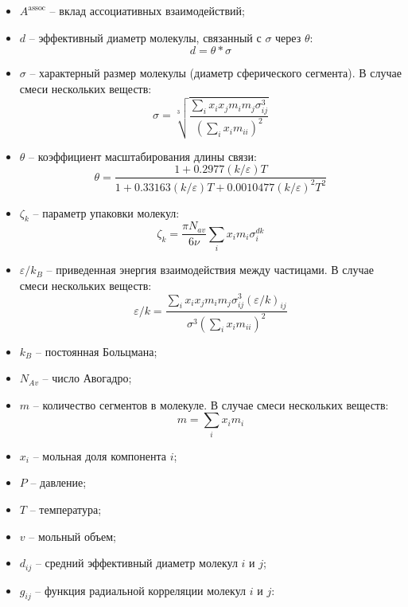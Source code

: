 \documentclass[a4paper,12pt]{article}
\begin{document}
\begin{itemize}
        \item \( A^{\text{assoc}} \) -- вклад ассоциативных взаимодействий;
        \item $d$ -- эффективный диаметр молекулы, связанный с $\sigma$ через $\theta$:
          \[
            d = \theta * \sigma
          \]
        \item $\sigma$ -- характерный размер молекулы (диаметр сферического сегмента). В случае смеси нескольких веществ:
          \begin{equation}
            \sigma = \sqrt[3]{\frac{\sum_i x_i x_j m_i m_j \sigma_{ij}^3}{(\sum_i x_i m_{ii})^2}}
          \end{equation}
        \item $\theta$ -- коэффициент масштабирования длины связи:
          \[
          \theta = \frac{1 + 0.2977 (k / \varepsilon) T}{1 + 0.33163 (k / \varepsilon) T + 0.0010477 (k / \varepsilon)^2 T^2}
          \]
        \item $\zeta_k$ -- параметр упаковки молекул:
          \[
          \zeta_k = \frac{\pi N_{av}}{6 \nu} \sum_i x_i m_i \sigma_i^{dk}
          \]
        \item $\varepsilon / k_B$ -- приведенная энергия взаимодействия между частицами. В случае смеси нескольких веществ:
          \begin{equation}
            \varepsilon / k = \frac{\sum_i x_i x_j m_i m_j \sigma_{ij}^3 (\varepsilon / k)_{ij}}{\sigma^3 (\sum_i x_i m_{ii})^2}
          \end{equation}
        \item $k_B$ -- постоянная Больцмана;
        \item $N_{Av}$ -- число Авогадро;
        \item $m$ -- количество сегментов в молекуле. В случае смеси нескольких веществ:
          \begin{equation}
            m = \sum_i x_i m_i
          \end{equation}
        \item $x_i$ -- мольная доля компонента $i$;
        \item $P$ -- давление;
        \item $T$ -- температура;
        \item $v$ -- мольный объем;
        \item $d_{ij}$ -- средний эффективный диаметр молекул $i$ и $j$;
        \item $g_{ij}$ -- функция радиальной корреляции молекул $i$ и $j$:
          \begin{equation}

\end{equation}
\end{itemize}
\end{document}
